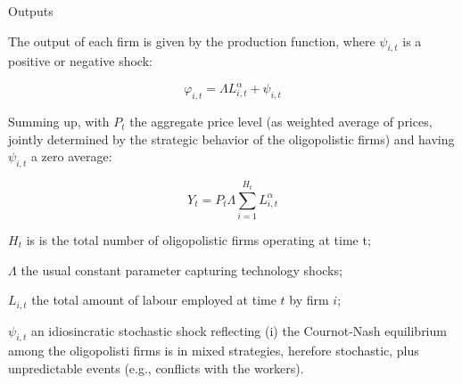 \documentclass[9pt]{beamer}
\begin{document}
\begin{frame}{Outputs}

The output of each firm is given by the production function, where $\psi _{i,t}$ is a positive or negative shock:

\begin{equation}
\varphi _{i,t}=\Lambda L_{i,t}^{\alpha }+\psi _{i,t}
\end{equation}

Summing up, with $P_t$ the aggregate price level (as weighted average of prices, jointly determined by the strategic behavior of the oligopolistic firms) and having $\psi _{i,t}$ a zero average:

\begin{equation}
Y_{t}=P_{t}\Lambda \overset{H_{t}}{\underset{i=1}{\sum }}L_{i,t}^{\alpha}
\end{equation}

\smallskip
\small
$H_{t}$ is is the total number of oligopolistic firms operating at time t;

$\Lambda$ the usual constant parameter capturing technology shocks;

$L_{i,t}$ the total amount of labour employed at time $t$ by firm $i$;

$\psi _{i,t}$ an idiosincratic stochastic shock reflecting (i) the Cournot-Nash equilibrium among the oligopolisti firms is in mixed strategies, herefore stochastic, plus unpredictable events (e.g., conflicts with the workers).

\end{frame}
\end{document}
